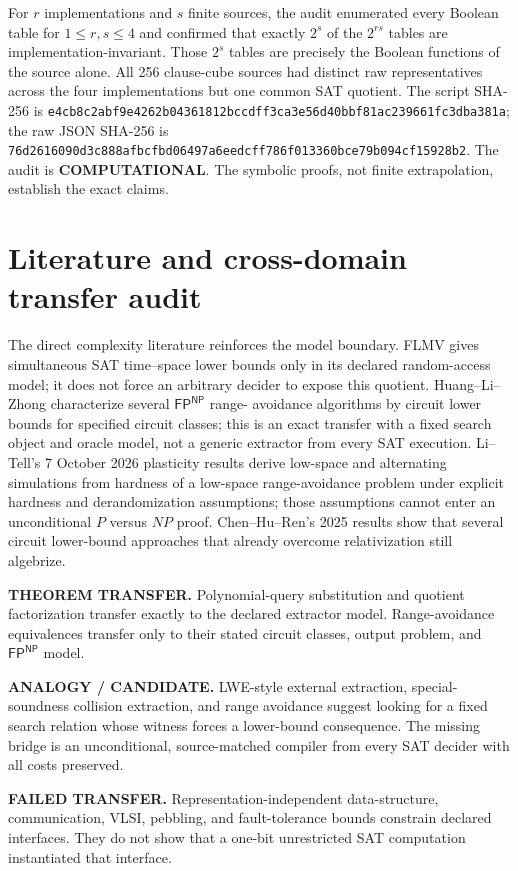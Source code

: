 \documentclass[11pt]{article}
\newcommand{\COMP}{\textbf{COMPUTATIONAL}}
\begin{document}
For $r$ implementations and $s$ finite sources, the audit enumerated every
Boolean table for $1\le r,s\le4$ and confirmed that exactly $2^s$ of the
$2^{rs}$ tables are implementation-invariant.  Those $2^s$ tables are
precisely the Boolean functions of the source alone.  All 256 clause-cube
sources had distinct raw representatives across the four implementations but
one common SAT quotient.  The script SHA-256 is
\nolinkurl{e4cb8c2abf9e4262b04361812bccdff3ca3e56d40bbf81ac239661fc3dba381a};
the raw JSON SHA-256 is
\nolinkurl{76d2616090d3c888afbcfbd06497a6eedcff786f013360bce79b094cf15928b2}.
The audit is \COMP.  The symbolic proofs, not finite extrapolation, establish
the exact claims.

\section{Literature and cross-domain transfer audit}

The direct complexity literature reinforces the model boundary.  FLMV gives
simultaneous SAT time--space lower bounds only in its declared random-access
model; it does not force an arbitrary decider to expose this quotient.
Huang--Li--Zhong characterize several $\mathsf{FP}^{\mathsf{NP}}$ range-
avoidance algorithms by circuit lower bounds for specified circuit classes;
this is an exact transfer with a fixed search object and oracle model, not a
generic extractor from every SAT execution.  Li--Tell's 7 October 2026
plasticity results derive low-space and alternating simulations from hardness
of a low-space range-avoidance problem under explicit hardness and
derandomization assumptions; those assumptions cannot enter an unconditional
$P$ versus $NP$ proof.  Chen--Hu--Ren's 2025 results show that several circuit
lower-bound approaches that already overcome relativization still algebrize.

\begin{description}[leftmargin=0cm,labelwidth=0cm]
\item[] \textbf{THEOREM TRANSFER.}
Polynomial-query substitution and quotient factorization transfer exactly to
the declared extractor model.  Range-avoidance equivalences transfer only to
their stated circuit classes, output problem, and $\mathsf{FP}^{\mathsf{NP}}$
model.
\item[] \textbf{ANALOGY / CANDIDATE.}
LWE-style external extraction, special-soundness collision extraction, and
range avoidance suggest looking for a fixed search relation whose witness
forces a lower-bound consequence.  The missing bridge is an unconditional,
source-matched compiler from every SAT decider with all costs preserved.
\item[] \textbf{FAILED TRANSFER.}
Representation-independent data-structure, communication, VLSI, pebbling,
and fault-tolerance bounds constrain declared interfaces.  They do not show
that a one-bit unrestricted SAT computation instantiated that interface.
\end{description}
\end{document}
